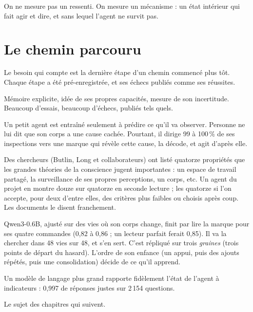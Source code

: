 \documentclass[fontsize=10pt,paper=a4,parskip=half-]{scrartcl}
\newcommand{\lead}[1]{{\fontsize{12}{16.5}\selectfont\color{ink!85!black}#1\par}\vspace{0.3em}}
\newcommand{\q}[1]{\og #1\fg{}}
\newcommand{\pc}{\,\%}
\begin{document}
\begin{essentiel}
On ne mesure pas un ressenti. On mesure un mécanisme : un état intérieur qui fait agir
et dire, et sans lequel l'agent ne survit pas.
\end{essentiel}

\section{Le chemin parcouru}
\label{sec:avant}

\lead{Le \q{besoin qui compte} est la dernière étape d'un chemin commencé plus tôt.
Chaque étape a été pré-enregistrée, et ses échecs publiés comme ses réussites.}

\begin{description}[leftmargin=0pt,font=\sffamily\bfseries\color{ink},itemsep=0.35em]
\item[L'assistant.] Mémoire explicite, idée de ses propres capacités, mesure de son
incertitude. Beaucoup d'essais, beaucoup d'échecs, publiés tels quels.

\item[Chercher la cause de son propre corps.] Un petit agent est entraîné seulement à
prédire ce qu'il va observer. Personne ne lui dit que son corps a une cause cachée.
Pourtant, il dirige 99 à 100\pc{} de ses inspections vers une \q{marque} qui révèle cette
cause, la décode, et agit d'après elle.

\item[L'agent à indicateurs.] Des chercheurs (Butlin, Long et collaborateurs) ont listé
quatorze propriétés que les grandes théories de la conscience jugent importantes : un
\q{espace de travail} partagé, la surveillance de ses propres perceptions, un corps,
etc. Un agent du projet en montre douze sur quatorze en \q{seconde lecture} ; les quatorze
si l'on accepte, pour deux d'entre elles, des critères plus faibles ou choisis après coup.
Les documents le disent franchement.

\item[Le modèle de langage et son corps.] Qwen3-0.6B, ajusté sur des vies où son \q{corps}
change, finit par lire la marque pour ses quatre commandes (0,82 à 0,86 ; un lecteur
parfait ferait 0,85). Il va la chercher dans 48 vies sur 48, et s'en sert. C'est répliqué
sur trois \emph{graines} (trois points de départ du hasard). L'ordre de son \q{enfance}
(un appui, puis des ajouts répétés, puis une consolidation) décide de ce qu'il apprend.

\item[Menia parle de son agent.] Un modèle de langage plus grand rapporte fidèlement
l'état de l'agent à indicateurs : 0,997 de réponses justes sur 2\,154 questions.

\item[27 septembre 2026 : le besoin qui compte.] Le sujet des chapitres qui suivent.
\end{description}
\end{document}
